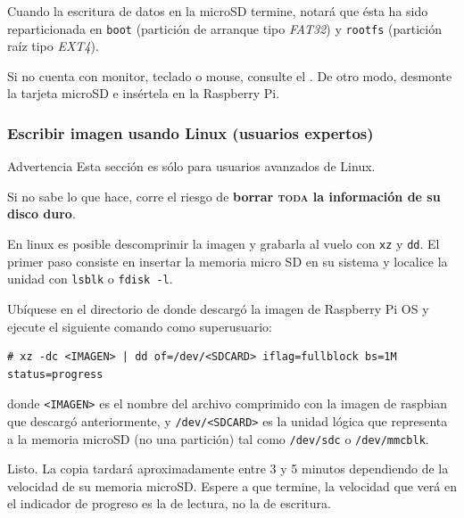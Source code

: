 \documentclass[letterpaper,10.5pt]{article}
\begin{document}
Cuando la escritura de datos en la microSD termine, notará que ésta ha sido reparticionada en \texttt{boot} (partición de arranque tipo \textit{FAT32}) y \texttt{rootfs} (partición raíz tipo \textit{EXT4}).

Si no cuenta con monitor, teclado o mouse, consulte el .
De otro modo, desmonte la tarjeta microSD e insértela en la Raspberry Pi.

%
%
\subsubsection{Escribir imagen usando Linux (usuarios expertos)}%
\begin{importantbox}{Advertencia}
	Esta sección es sólo para usuarios avanzados de Linux.

	Si no sabe lo que hace, corre el riesgo de \textbf{borrar \textsc{toda} la información de su disco duro}.
\end{importantbox}

\medskip{}

En linux es posible descomprimir la imagen y grabarla al vuelo con \texttt{xz} y \texttt{dd}.
El primer paso consiste en insertar la memoria micro SD en su sistema y localice la unidad con \texttt{lsblk} o \texttt{fdisk -l}.

Ubíquese en el directorio de donde descargó la imagen de Raspberry Pi OS y ejecute el siguiente comando como superusuario:
\begin{Verbatim}[gobble=1]
	# xz -dc <IMAGEN> | dd of=/dev/<SDCARD> iflag=fullblock bs=1M status=progress
\end{Verbatim}

\noindent
donde \texttt{<IMAGEN>} es el nombre del archivo comprimido con la imagen de raspbian que descargó anteriormente, y
\texttt{/dev/<SDCARD>} es la unidad lógica que representa a la memoria microSD (no una partición) tal como \texttt{/dev/sdc} o \texttt{/dev/mmcblk}.

\medskip

Listo.
La copia tardará aproximadamente entre 3 y 5 minutos dependiendo de la velocidad de su memoria microSD. %
Espere a que termine, la velocidad que verá en el indicador de progreso es la de lectura, no la de escritura.

%
%
\end{document}
